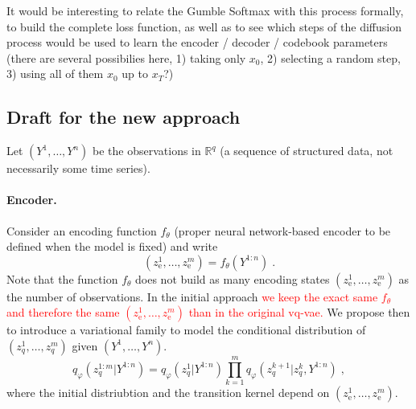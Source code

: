 \documentclass{article}
\newcommand{\rset}{\ensuremath{\mathbb{R}}}
\newcommand{\rmd}{\ensuremath{\mathrm{d}}}
\newcommand{\eqsp}{\;}
\newcommand{\rme}{\mathrm{e}}
\begin{document}
It would be interesting to relate the Gumble Softmax with this process formally, to build the complete loss function, as well as to see which steps of the diffusion process would be used to learn the encoder / decoder / codebook parameters (there are several possibilies here, 1) taking only $x_0$, 2) selecting a random step, 3) using all of them $x_0$ up to $x_T$?)

\clearpage
\newpage

\subsection*{Draft for the new approach}
 Let $(Y^1,\ldots,Y^n)$ be the observations in $\rset^q$ (a sequence of structured data, not necessarily some time series).
\paragraph{Encoder.} Consider an encoding function $f_\theta$ (proper neural network-based encoder  to be defined when the model is fixed) and write
$$
(z_\rme^1,\ldots, z_\rme^m) = f_\theta(Y^{1:n})\eqsp.
$$
Note that the function $f_\theta$ does not build as many encoding states $(z_\rme^1,\ldots, z_\rme^m)$ as the number of observations.
In the initial approach \textcolor{red}{we keep the exact same $f_{\theta}$ and therefore the same $(z_\rme^1,\ldots, z_\rme^m)$ than in the original vq-vae.}
We propose then to introduce a variational family to model the conditional distribution of $(z_q^1,\ldots, z_q^m)$ given $(Y^1,\ldots,Y^n)$.
$$
q_\varphi (z_q^{1:m} |Y^{1:n}) = q_\varphi(z_q^{1}|Y^{1:n})\prod_{k=1}^m q_\varphi(z_q^{k+1}|z_q^{k},Y^{1:n}) \eqsp,
$$
where the initial distriubtion and the transition kernel depend on $(z_\rme^1,\ldots, z_\rme^m)$.
\end{document}
